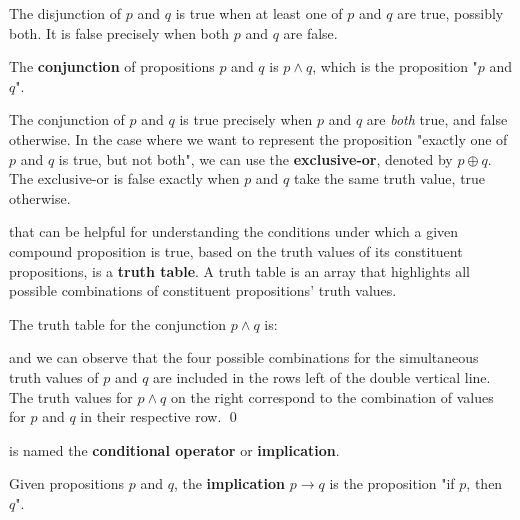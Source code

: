         The disjunction of $p$ and $q$ is true when at least one of $p$ and $q$ are true, possibly both. It is false precisely when both $p$ and $q$ are false. 
        
        \begin{definition}[Conjunction]\label{def:conj}
            The \textbf{conjunction} of propositions $p$ and $q$ is $p \land q$, which is the proposition "$p$ and $q$".
        \end{definition}

        The conjunction of $p$ and $q$ is true precisely when $p$ and $q$ are \emph{both} true, and false otherwise. In the case where we want to represent the proposition "exactly one of $p$ and $q$ is true, but not both", we can use the \textbf{exclusive-or}, denoted by $p \oplus q$. The exclusive-or is false exactly when $p$ and $q$ take the same truth value, true otherwise.

         that can be helpful for understanding the conditions under which a given compound proposition is true, based on the truth values of its constituent propositions, is a \textbf{truth table}. A truth table is an array that highlights all possible combinations of constituent propositions' truth values.

        \begin{example}\label{ex:conjtt}
            The truth table for the conjunction $p \land q$ is:
            
            
            \noindent and we can observe that the four possible combinations for the simultaneous truth values of $p$ and $q$ are included in the rows left of the double vertical line. The truth values for $p \land q$ on the right correspond to the combination of values for $p$ and $q$ in their respective row. \qed
        \end{example}
        
         is named the \textbf{conditional operator} or \textbf{implication}.

        \begin{definition}[Implication]\label{def:imp}
            Given propositions $p$ and $q$, the \textbf{implication} $p \rightarrow q$ is the proposition "if $p$, then $q$".
        \end{definition}

